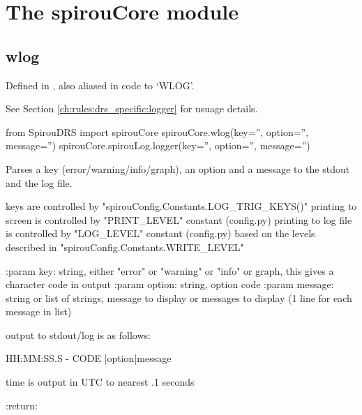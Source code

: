 
\clearpage
\newpage
\noindent\begin{minipage}{\textwidth}
\section{The spirouCore module}
\label{ch:the_module:spirouCore}

\subsection{wlog}
\label{ch:the_module:spirouCore:logger}

Defined in \spirouCore{}, also aliased in code to `WLOG'.

See Section \ref{ch:rules:drs_specific:logger} for usuage details.

\begin{pythonbox}
from SpirouDRS import spirouCore
spirouCore.wlog(key='', option='', message='')
spirouCore.spirouLog.logger(key='', option='', message='')
\end{pythonbox}

\begin{pythondocstring}
Parses a key (error/warning/info/graph), an option and a message to the
stdout and the log file.

keys are controlled by "spirouConfig.Constants.LOG_TRIG_KEYS()"
printing to screen is controlled by "PRINT_LEVEL" constant (config.py)
printing to log file is controlled by "LOG_LEVEL" constant (config.py)
based on the levels described in "spirouConfig.Constants.WRITE_LEVEL"

:param key: string, either "error" or "warning" or "info" or graph, this
            gives a character code in output
:param option: string, option code
:param message: string or list of strings, message to display or messages
                to display (1 line for each message in list)

output to stdout/log is as follows:

    HH:MM:SS.S - CODE |option|message

time is output in UTC to nearest .1 seconds

:return:
\end{pythondocstring}
\end{minipage}

